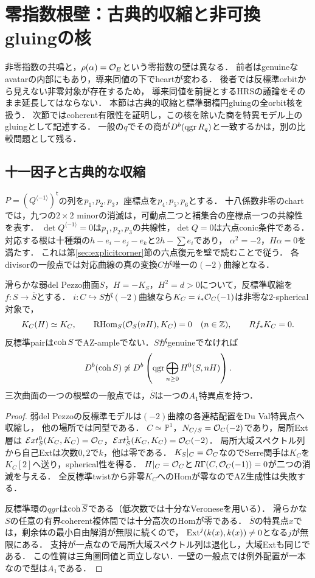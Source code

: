 \section{零指数根壁：古典的収縮と非可換gluingの核}\label{sec:zero-walls}
非零指数の共鳴と，$\rho(\alpha)=\mathcal O_E$という零指数の壁は異なる．
前者はgenuineなavatarの内部にもあり，導来同値の下でheartが変わる．
後者では反標準orbitから見えない非零対象が存在するため，
導来同値を前提とするHRSの議論をそのまま延長してはならない．
本節は古典的収縮と標準弱楕円gluingの全orbit核を扱う．
次節ではcoherent有限性を証明し，この核を除いた商を特異モデル上のgluingとして記述する．
一般の$q$でその商が$D^b(\operatorname{qgr} R_q)$と一致するかは，別の比較問題として残る．

\subsection{十一因子と古典的な収縮}
$P=(Q^{\langle-1\rangle})^{\mathsf t}$の列を$p_1,p_2,p_3$，座標点を$p_4,p_5,p_6$とする．
十八係数非零のchartでは，九つの$2\times2$ minorの消滅は，可動点二つと補集合の座標点一つの共線性を表す．
$\det Q^{\langle-1\rangle}=0$は$p_1,p_2,p_3$の共線性，$\det Q=0$は六点conic条件である．
対応する根は十種類の$h-e_i-e_j-e_k$と$2h-\sum e_i$であり，
$\alpha^2=-2$，$H\alpha=0$を満たす．
これは第\ref{sec:explicitcorner}節の六点復元を壁で読むことで従う．
各divisorの一般点では対応曲線の真の変換$C$が唯一の$(-2)$曲線となる．

\begin{theorem}[古典的根壁の不可視対象]\label{thm:zero-classical-contraction}
滑らかな弱del Pezzo曲面$S$，$H=-K_S$，$H^2=d>0$について，反標準収縮を$f:S\to\overline S$とする．
$i:C\hookrightarrow S$が$(-2)$曲線なら$K_C=i_*\mathcal O_C(-1)$は非零な$2$-spherical対象で，
\[
 K_C(H)\simeq K_C,\qquad
 \operatorname{RHom}_S(\mathcal O_S(nH),K_C)=0\quad(n\in\mathbb Z),\qquad Rf_*K_C=0.
\]
反標準pairは$\operatorname{coh} S$でAZ-ampleでない．$S$がgenuineでなければ
\[
 D^b(\operatorname{coh} S)\not\simeq D^b\left(\operatorname{qgr}\bigoplus_{n\ge0}H^0(S,nH)\right).
\]
三次曲面の一つの根壁の一般点では，$\overline S$は一つの$A_1$特異点を持つ．
\end{theorem}
\begin{proof}
弱del Pezzoの反標準モデルは$(-2)$曲線の各連結配置をDu Val特異点へ収縮し，
他の場所では同型である\cite[Theorem 8.3.2, \S8.3.2]{DolgachevWalls}．
$C\simeq\mathbb P^1$，$N_{C/S}=\mathcal O_C(-2)$であり，局所Ext層は
$\mathcal Ext^0_S(K_C,K_C)=\mathcal O_C$，$\mathcal Ext^1_S(K_C,K_C)=\mathcal O_C(-2)$．
局所大域スペクトル列から自己Extは次数$0,2$で$k$，他は零である．
$K_S|_C=\mathcal O_C$なのでSerre関手は$K_C$を$K_C[2]$へ送り，spherical性を得る．
$H|_C=\mathcal O_C$と$R\Gamma(C,\mathcal O_C(-1))=0$が二つの消滅を与える．
全反標準twistから非零$K_C$へのHomが零なのでAZ生成性は失敗する．

反標準環の$qgr$は$\operatorname{coh}\overline S$である（低次数では十分なVeroneseを用いる）．
滑らかな$S$の任意の有界coherent複体間では十分高次のHomが零である．
$\overline S$の特異点$x$では，剰余体の最小自由解消が無限に続くので，
$\operatorname{Ext}^j(k(x),k(x))\ne0$となる$j$が無限にある．
支持が一点なので局所大域スペクトル列は退化し，大域Extも同じである．
この性質は三角圏同値と両立しない．一壁の一般点では例外配置が一本なので型は$A_1$である．
\end{proof}

